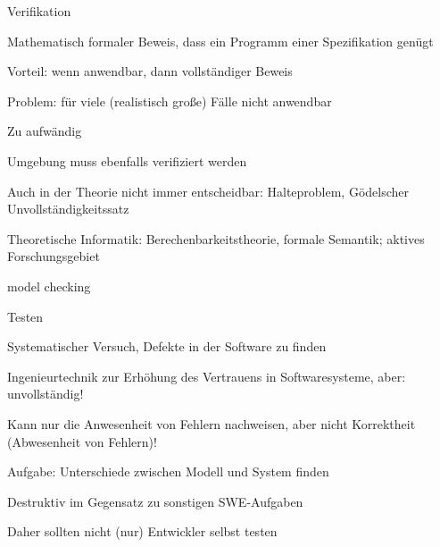 \documentclass[a4paper]{article}
\begin{document}
\begin{multicols}{3}
  Verifikation
  \begin{itemize*}
    \item Mathematisch formaler Beweis, dass ein Programm einer Spezifikation genügt
    \item Vorteil: wenn anwendbar, dann vollständiger Beweis
    \item Problem: für viele (realistisch große) Fälle nicht anwendbar
          \begin{itemize*}
            \item Zu aufwändig
            \item Umgebung muss ebenfalls verifiziert werden
            \item Auch in der Theorie nicht immer entscheidbar: Halteproblem, Gödelscher Unvollständigkeitssatz
          \end{itemize*}
    \item Theoretische Informatik: Berechenbarkeitstheorie, formale Semantik; aktives Forschungsgebiet
          \begin{itemize*}
            \item model checking
          \end{itemize*}
  \end{itemize*}

  Testen
  \begin{itemize*}
    \item Systematischer Versuch, Defekte in der Software zu finden
    \item Ingenieurtechnik zur Erhöhung des Vertrauens in Softwaresysteme, aber: unvollständig!
          \begin{itemize*}
            \item Kann nur die Anwesenheit von Fehlern nachweisen, aber nicht Korrektheit (Abwesenheit von Fehlern)!
          \end{itemize*}
    \item Aufgabe: Unterschiede zwischen Modell und System finden
    \item Destruktiv im Gegensatz zu sonstigen SWE-Aufgaben
          \begin{itemize*}
            \item Daher sollten nicht (nur) Entwickler selbst testen
          \end{itemize*}
  \end{itemize*}


\end{multicols}
\end{document}
